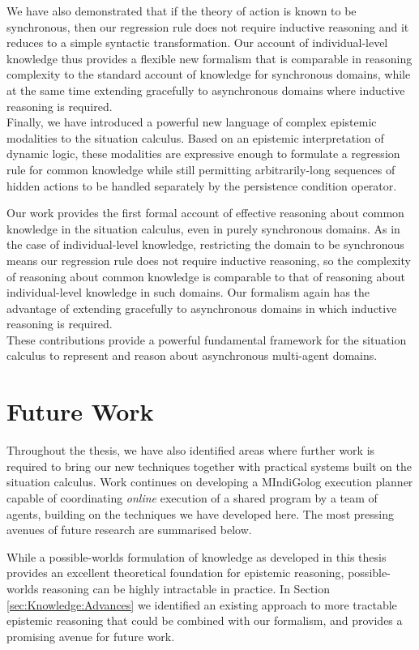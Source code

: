 We have also demonstrated that if the theory of action is known to
be synchronous, then our regression rule does not require inductive
reasoning and it reduces to a simple syntactic transformation. Our
account of individual-level knowledge thus provides a flexible new
formalism that is comparable in reasoning complexity to the standard
account of knowledge for synchronous domains, while at the same time
extending gracefully to asynchronous domains where inductive reasoning
is required.\\


Finally, we have introduced a powerful new language of complex epistemic
modalities to the situation calculus. Based on an epistemic interpretation
of dynamic logic, these modalities are expressive enough to formulate
a regression rule for common knowledge while still permitting arbitrarily-long
sequences of hidden actions to be handled separately by the persistence
condition operator.

Our work provides the first formal account of effective reasoning
about common knowledge in the situation calculus, even in purely synchronous
domains. As in the case of individual-level knowledge, restricting
the domain to be synchronous means our regression rule does not require
inductive reasoning, so the complexity of reasoning about common knowledge
is comparable to that of reasoning about individual-level knowledge
in such domains. Our formalism again has the advantage of extending
gracefully to asynchronous domains in which inductive reasoning is
required.\\


These contributions provide a powerful fundamental framework for the
situation calculus to represent and reason about asynchronous multi-agent
domains.


\section{Future Work}

Throughout the thesis, we have also identified areas where further
work is required to bring our new techniques together with practical
systems built on the situation calculus. Work continues on developing
a MIndiGolog execution planner capable of coordinating \emph{online}
execution of a shared program by a team of agents, building on the
techniques we have developed here. The most pressing avenues of future
research are summarised below.

While a possible-worlds formulation of knowledge as developed in this
thesis provides an excellent theoretical foundation for epistemic
reasoning, possible-worlds reasoning can be highly intractable in
practice. In Section \ref{sec:Knowledge:Advances} we identified an
existing approach to more tractable epistemic reasoning that could
be combined with our formalism, and provides a promising avenue for
future work.

